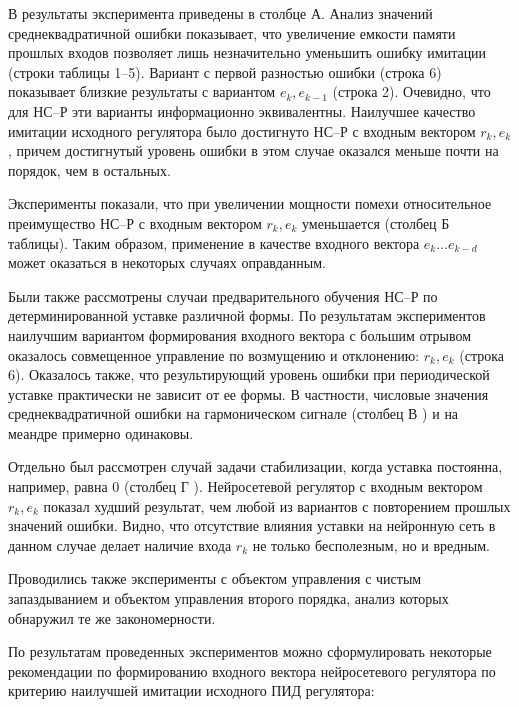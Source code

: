 
В  результаты эксперимента приведены
в столбце {\sf А}.  Анализ значений среднеквадратичной ошибки
показывает, что увеличение емкости памяти прошлых входов позволяет
лишь незначительно уменьшить ошибку имитации (строки таблицы 1--5).
Вариант с первой разностью ошибки (строка 6) показывает близкие
результаты с вариантом $e_k,e_{k-1}$ (строка 2).  Очевидно, что для
НС--Р эти варианты информационно эквивалентны.  Наилучшее качество
имитации исходного регулятора было достигнуто НС--Р с входным вектором
$r_k,e_k$, причем достигнутый уровень ошибки в этом случае оказался
меньше почти на порядок, чем в остальных.

Эксперименты показали, что при увеличении мощности помехи
относительное преимущество НС--Р с входным вектором $r_k,e_k$
уменьшается (столбец {\sf Б} таблицы).  Таким образом, применение в
качестве входного вектора $e_k\ldots e_{k-d}$ может оказаться в
некоторых случаях оправданным.

Были также рассмотрены случаи предварительного обучения НС--Р по
детерминированной уставке различной формы.  По результатам
экспериментов наилучшим вариантом формирования входного вектора с
большим отрывом оказалось совмещенное управление по возмущению и
отклонению: $r_k,e_k$ (строка 6).  Оказалось также, что результирующий
уровень ошибки при периодической уставке практически не зависит от ее
формы.  В частности, числовые значения среднеквадратичной ошибки на
гармоническом сигнале (столбец {\sf В}
) и на меандре примерно одинаковы.

Отдельно был рассмотрен случай задачи стабилизации, когда уставка
постоянна, например, равна 0 (столбец {\sf Г}
).  Нейросетевой регулятор с
входным вектором $r_k,e_k$ показал худший результат, чем любой из
вариантов с повторением прошлых значений ошибки.  Видно, что
отсутствие влияния уставки на нейронную сеть в данном случае делает
наличие входа $r_k$ не только бесполезным, но и вредным.

Проводились также эксперименты с объектом управления с чистым
запаздыванием и объектом управления второго порядка, анализ которых
обнаружил те же закономерности.

По результатам проведенных экспериментов можно сформулировать
некоторые рекомендации по формированию входного вектора нейросетевого
регулятора по критерию наилучшей имитации исходного ПИД регулятора:

